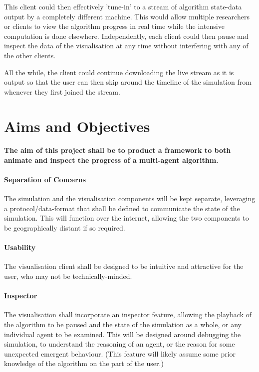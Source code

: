 \documentclass[a4paper]{article}
\begin{document}
		This client could then effectively 'tune-in' to a stream of algorithm state-data output by a completely different machine. This would allow multiple researchers or clients to view the algorithm progress in real time while the intensive computation is done elsewhere. Independently, each client could then pause and inspect the data of the visualisation at any time without interfering with any of the other clients.

		All the while, the client could continue downloading the live stream as it is output so that the user can then skip around the timeline of the simulation from whenever they first joined the stream.

	\section{Aims and Objectives}

		\paragraph{The aim of this project shall be to product a framework to both animate and inspect the progress of a multi-agent algorithm.}

		\paragraph{Separation of Concerns} The simulation and the visualisation components will be kept separate, leveraging a protocol/data-format that shall be defined to communicate the state of the simulation. This will function over the internet, allowing the two components to be geographically distant if so required.

		\paragraph{Usability} The visualisation client shall be designed to be intuitive and attractive for the user, who may not be technically-minded.

		\paragraph{Inspector} The visualisation shall incorporate an inspector feature, allowing the playback of the algorithm to be paused and the state of the simulation as a whole, or any individual agent to be examined. This will be designed around debugging the simulation, to understand the reasoning of an agent, or the reason for some unexpected emergent behaviour. (This feature will likely assume some prior knowledge of the algorithm on the part of the user.)
\end{document}
